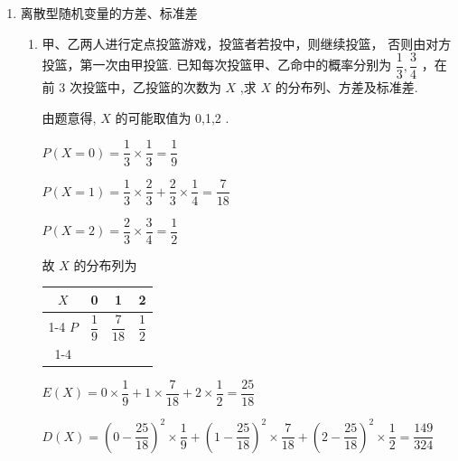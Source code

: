 \begin{enumerate}
\begin{enumerate}
\begin{jieda}
\begin{enumerate}
\begin{center}
                \end{center}
                
                则数学期望为 $E\left( X\right)  = 0 \times  \dfrac{1}{35} + 1 \times  \dfrac{12}{35} + 2 \times  \dfrac{18}{35} + 3 \times  \dfrac{4}{35} = \dfrac{12}{7}$ .
            \end{enumerate}
        \end{jieda}
    \end{enumerate}
    \item 离散型随机变量的方差、标准差
    \begin{enumerate}
        
        \item 甲、乙两人进行定点投篮游戏，投篮者若投中，则继续投篮， 否则由对方投篮，第一次由甲投篮. 已知每次投篮甲、乙命中的概率分别为 $\dfrac{1}{3},\dfrac{3}{4}$ ，在前 3 次投篮中，乙投篮的次数为 $X$ ,求 $X$ 的分布列、方差及标准差.
        \begin{jieda}
            由题意得, $X$ 的可能取值为 0,1,2 .
            
            $P\left( {X = 0}\right)  = \dfrac{1}{3} \times  \dfrac{1}{3} = \dfrac{1}{9}$
            
            $P\left( {X = 1}\right)  = \dfrac{1}{3} \times  \dfrac{2}{3} + \dfrac{2}{3} \times  \dfrac{1}{4} = \dfrac{7}{18}$
            
            $P\left( {X = 2}\right)  = \dfrac{2}{3} \times  \dfrac{3}{4} = \dfrac{1}{2}$
            
            故 $X$ 的分布列为
            
            \begin{center}
            
            \begin{tabular}{|c|c|c|c|}
            \hline
            $X$ & 0 & 1 & 2 \\
            \cline{1-4}
            $P$ & $\dfrac{1}{9}$ & $\dfrac{7}{18}$ & $\dfrac{1}{2}$ \\
            \cline{1-4}
            \hline
            \end{tabular}
            
            \end{center}
            
            $E\left( X\right)  = 0 \times  \dfrac{1}{9} + 1 \times  \dfrac{7}{18} + 2 \times  \dfrac{1}{2} = \dfrac{25}{18}$
            
            $D\left( X\right)  = {\left( 0 - \dfrac{25}{18}\right) }^{2} \times  \dfrac{1}{9} + {\left( 1 - \dfrac{25}{18}\right) }^{2} \times  \dfrac{7}{18} + {\left( 2 - \dfrac{25}{18}\right) }^{2} \times  \dfrac{1}{2} = \dfrac{149}{324}$
            

\end{jieda}
\end{enumerate}
\end{enumerate}
